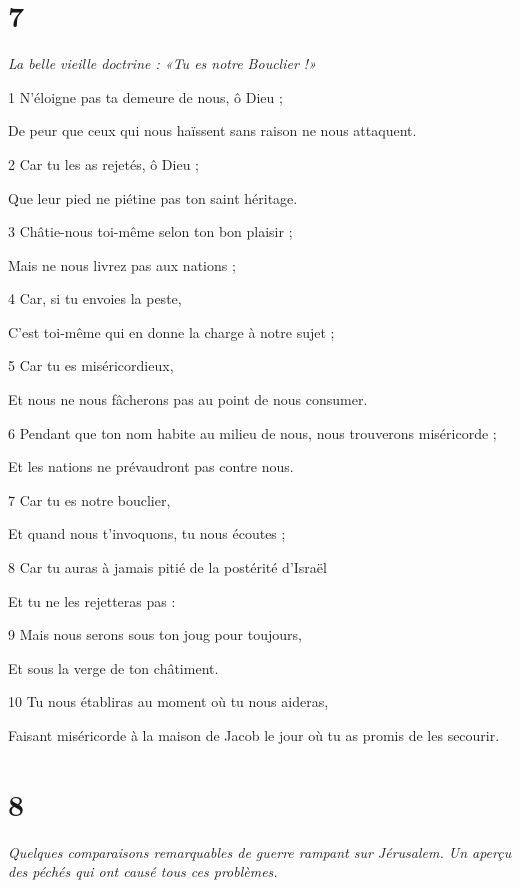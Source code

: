 \chapter{7}

\par \textit{La belle vieille doctrine : «Tu es notre Bouclier !»}

\par 1 N'éloigne pas ta demeure de nous, ô Dieu ;
\par     De peur que ceux qui nous haïssent sans raison ne nous attaquent.
\par 2 Car tu les as rejetés, ô Dieu ;
\par     Que leur pied ne piétine pas ton saint héritage.
\par 3 Châtie-nous toi-même selon ton bon plaisir ;
\par     Mais ne nous livrez pas aux nations ;
\par 4 Car, si tu envoies la peste,
\par     C'est toi-même qui en donne la charge à notre sujet ;
\par 5 Car tu es miséricordieux,
\par     Et nous ne nous fâcherons pas au point de nous consumer.
\par   
\par 6 Pendant que ton nom habite au milieu de nous, nous trouverons miséricorde ;
\par     Et les nations ne prévaudront pas contre nous.
\par 7 Car tu es notre bouclier,
\par     Et quand nous t’invoquons, tu nous écoutes ;
\par 8 Car tu auras à jamais pitié de la postérité d'Israël
\par     Et tu ne les rejetteras pas :
\par 9 Mais nous serons sous ton joug pour toujours,
\par     Et sous la verge de ton châtiment.
\par 10 Tu nous établiras au moment où tu nous aideras,
\par     Faisant miséricorde à la maison de Jacob le jour où tu as promis de les secourir.

\chapter{8}

\par \textit{Quelques comparaisons remarquables de guerre rampant sur Jérusalem. Un aperçu des péchés qui ont causé tous ces problèmes.}

